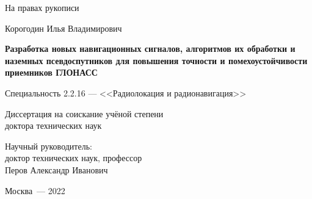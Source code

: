 
\begin{titlepage}
\vspace{-10ex}

    \thispagestyle{empty}

    \vspace{-3ex}

    \begin{centering}

        \vspace{1cm}

        \begin{flushright}
        	На правах рукописи
        \end{flushright}

        \vspace{2cm}
        
        {\large
		Корогодин Илья Владимирович
		}
        \vspace{1.5cm}

        {\large
		\textbf{
		 Разработка новых навигационных сигналов, алгоритмов их обработки и наземных псевдоспутников для повышения точности и помехоустойчивости приемников ГЛОНАСС
		}
		}

        \vspace{1cm}
		Специальность 2.2.16 --- <<Радиолокация и радионавигация>>
 
        \vspace{1cm}
        Диссертация на соискание учёной степени\\ доктора технических наук

        \vspace{1.5cm}
        \begin{flushright}
        	Научный руководитель:\\
        	доктор технических наук, профессор\\
        	Перов Александр Иванович
        \end{flushright}
        
        \vspace{1cm}
		\vfill
     	Москва~--- 2022
        
    \end{centering}
\end{titlepage}